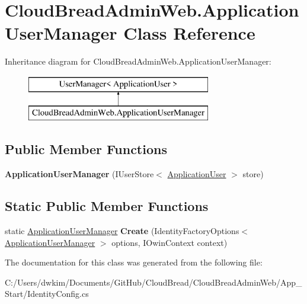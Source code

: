 \hypertarget{a00019}{}\section{Cloud\+Bread\+Admin\+Web.\+Application\+User\+Manager Class Reference}
\label{a00019}
Inheritance diagram for Cloud\+Bread\+Admin\+Web.\+Application\+User\+Manager\+:\begin{figure}[H]
\begin{center}
\leavevmode
\includegraphics[height=2.000000cm]{a00019}
\end{center}
\end{figure}
\subsection*{Public Member Functions}
\begin{DoxyCompactItemize}
\item 
{\bfseries Application\+User\+Manager} (I\+User\+Store$<$ \hyperlink{a00018}{Application\+User} $>$ store)\hypertarget{a00019_ac64e803f424ca85090b245bcf18ec514}{}\label{a00019_ac64e803f424ca85090b245bcf18ec514}

\end{DoxyCompactItemize}
\subsection*{Static Public Member Functions}
\begin{DoxyCompactItemize}
\item 
static \hyperlink{a00019}{Application\+User\+Manager} {\bfseries Create} (Identity\+Factory\+Options$<$ \hyperlink{a00019}{Application\+User\+Manager} $>$ options, I\+Owin\+Context context)\hypertarget{a00019_ae2188287f4231a9b68f1204a634e97fd}{}\label{a00019_ae2188287f4231a9b68f1204a634e97fd}

\end{DoxyCompactItemize}


The documentation for this class was generated from the following file\+:\begin{DoxyCompactItemize}
\item 
C\+:/\+Users/dwkim/\+Documents/\+Git\+Hub/\+Cloud\+Bread/\+Cloud\+Bread\+Admin\+Web/\+App\+\_\+\+Start/Identity\+Config.\+cs\end{DoxyCompactItemize}
